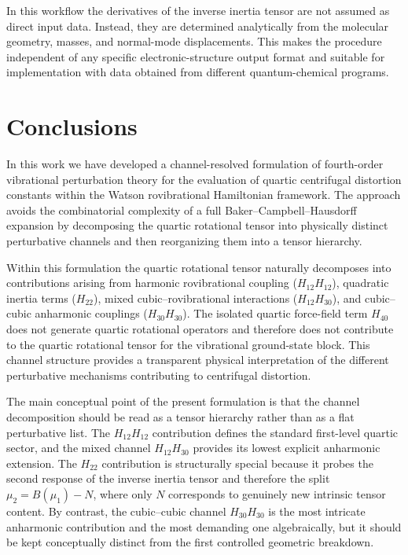 \documentclass[aip,jcp,reprint]{revtex4-2}
\begin{document}
In this workflow the derivatives of the inverse inertia tensor are not assumed as direct input data. Instead, they are determined
analytically from the molecular geometry, masses, and normal-mode displacements. This makes the procedure independent of any specific
electronic-structure output format and suitable for implementation with data obtained from different quantum-chemical programs.

\section{Conclusions}
In this work we have developed a channel-resolved formulation of
fourth-order vibrational perturbation theory for the evaluation of
quartic centrifugal distortion constants within the Watson rovibrational
Hamiltonian framework. The approach avoids the combinatorial complexity
of a full Baker--Campbell--Hausdorff expansion by decomposing the quartic
rotational tensor into physically distinct perturbative channels and
then reorganizing them into a tensor hierarchy.

Within this formulation the quartic rotational tensor naturally
decomposes into contributions arising from harmonic rovibrational
coupling ($H_{12}H_{12}$), quadratic inertia terms ($H_{22}$),
mixed cubic--rovibrational interactions ($H_{12}H_{30}$), and
cubic--cubic anharmonic couplings ($H_{30}H_{30}$).
The isolated quartic force-field term $H_{40}$ does not generate
quartic rotational operators and therefore does not contribute to the
quartic rotational tensor for the vibrational ground-state block.
This channel structure provides a transparent physical interpretation
of the different perturbative mechanisms contributing to centrifugal
distortion.

The main conceptual point of the present formulation is that the channel
decomposition should be read as a tensor hierarchy rather than as a flat
perturbative list. The $H_{12}H_{12}$ contribution defines the standard
first-level quartic sector, and the mixed channel $H_{12}H_{30}$ provides
its lowest explicit anharmonic extension. The $H_{22}$ contribution is
structurally special because it probes the second response of the inverse
inertia tensor and therefore the split $\mu_2 = B(\mu_1) - N$, where only
$N$ corresponds to genuinely new intrinsic tensor content. By contrast,
the cubic--cubic channel $H_{30}H_{30}$ is the most intricate anharmonic
contribution and the most demanding one algebraically, but it should be
kept conceptually distinct from the first controlled geometric breakdown.
\end{document}
